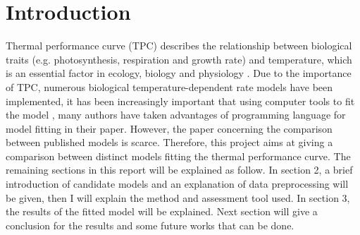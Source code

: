 \section{Introduction}

Thermal performance curve (TPC) describes the relationship between biological traits (e.g. photosynthesis, respiration and growth rate) and temperature, which is an essential factor in ecology, biology and physiology \cite{huey_1989}. Due to the importance of TPC, numerous biological temperature-dependent rate models have been implemented, it has been increasingly important that using computer tools to ﬁt the model \cite{angilletta_2002}, many authors have taken advantages of programming language for model ﬁtting in their paper. However, the paper concerning the comparison between published models is scarce. Therefore, this project aims at giving a comparison between distinct models ﬁtting the thermal performance curve. The remaining sections in this report will be explained as follow. In section 2, a brief introduction of candidate models and an explanation of data preprocessing will be given, then I will explain the method and assessment tool used. In section 3, the results of the ﬁtted model will be explained. Next section will give a conclusion for the results and some future works that can be done.
